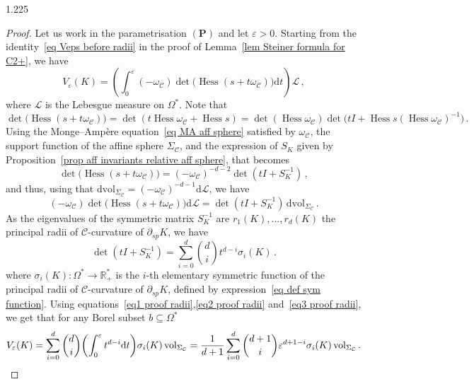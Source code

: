 \documentclass[reqno, a4paper]{amsart}
\numberwithin{equation}{section}
\numberwithin{figure}{section}
\theoremstyle{definition}
\theoremstyle{remark}
\newcommand{\R}{\mathbb{R}} %
\newcommand{\dif}{\mathrm{d}} %
\DeclareMathOperator{\Hess}{Hess} %
\newcommand{\C}{\mathcal{C}} %
\renewcommand{\S}{\Sigma_\C} %
\newcommand{\vol}{\mathrm{vol}} %
\newcommand{\dvol}{\dif \mathrm{vol}} %
\newcommand{\vp}[1]{{\left( {#1} \right)}} %
\newcommand{\bp}[1]{{\bigl( {#1} \bigr)}} %
\begin{document}
\begin{spacing}{1.225}
\begin{proof}
Let us work in the parametrisation $(\mathbf{P})$ and let $\varepsilon>0$. Starting from the identity~\eqref{eq Veps before radii} in the proof of Lemma~\ref{lem Steiner formula for C2+}, we have 
\begin{equation}
\label{eq1 proof radii}
V_\varepsilon(K) = \vp{\int_0^\varepsilon (-\omega_\C)\det\bp{\Hess (s + t \omega_\C)} \dif t} \mathcal{L} \, ,
\end{equation}
where $\mathcal{L}$ is the Lebesgue measure on $\Omega^*$. Note that
\begin{equation*}
\det\bp{\Hess (s + t \omega_\C)} = \det(t \Hess \omega_\C + \Hess s) =\det(\Hess \omega_\C)\det\bp{tI + \Hess s (\Hess \omega_\C)^{-1}} \, . 
\end{equation*}
Using the Monge--Amp\`ere equation~\eqref{eq MA aff sphere} satisfied by $\omega_\C$, the support function of the affine sphere $\S$, and the expression of $S_K$ given by Proposition~\ref{prop aff invariants relative aff sphere}, that becomes
\begin{equation*}
\det\bp{\Hess (s + t \omega_\C)} = (-\omega_\C)^{-d-2} \det(tI + S_K^{-1}) \, ,
\end{equation*}
and thus, using that $\dvol_{\S} = (-\omega_\C)^{-d-1} \dif \mathcal{L}$, we have 
\begin{equation}
\label{eq2 proof radii}
(-\omega_\C)\det\bp{\Hess (s + t \omega_\C)} \dif \mathcal{L} = \det(tI + S_K^{-1}) \, \dvol_{\S} \, . 
\end{equation}
As the eigenvalues of the symmetric matrix $S_K^{-1}$ are $r_1(K),\dots,r_d(K)$ the principal radii of $\C$-curvature of $\partial_{sp}K$, we have 
\begin{equation}
\label{eq3 proof radii}
\det(tI + S_K^{-1}) = \sum_{i=0}^d \binom{d}{i}t^{d-i} \sigma_i(K) \, . 
\end{equation}
where $\sigma_i(K) : \Omega^* \to \R^*_+$ is the $i$-th elementary symmetric function of the principal radii of $\C$-curvature of $\partial_{sp} K$, defined by expression~\eqref{eq def sym function}.
Using equations~\eqref{eq1 proof radii},\eqref{eq2 proof radii} and~\eqref{eq3 proof radii}, we get that for any Borel subset $b \subseteq \Omega^*$ 
\begin{equation*}
V_\varepsilon(K) = \sum_{i=0}^d \binom{d}{i}\vp{\int_0^\varepsilon t^{d-i} \dif t} \sigma_i(K) \, \vol_{\S} = \frac{1}{d+1}\sum_{i=0}^d \binom{d+1}{i}\varepsilon^{d+1-i} \sigma_i(K) \, \vol_{\S} \, . \qedhere
\end{equation*}
\end{proof}


\end{spacing}
\end{document}
